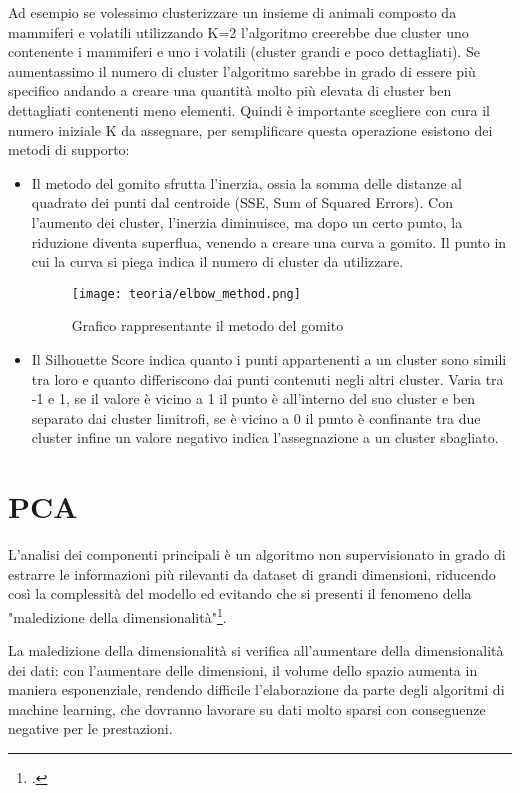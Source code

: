 Ad esempio se volessimo clusterizzare un insieme di animali composto da mammiferi e volatili utilizzando K=2 l'algoritmo creerebbe due cluster uno contenente i mammiferi e uno i volatili  (cluster grandi e poco dettagliati).
Se aumentassimo il numero di cluster l'algoritmo sarebbe in grado di essere più specifico andando a creare una quantità molto più elevata di cluster ben dettagliati contenenti meno elementi.
Quindi è importante scegliere con cura il numero iniziale K da assegnare, per semplificare questa operazione esistono dei metodi di supporto:
\begin{itemize}
    \item Il metodo del gomito sfrutta l’inerzia, ossia la somma delle distanze al quadrato dei punti dal centroide (SSE, Sum of Squared Errors). Con l'aumento dei cluster, l’inerzia diminuisce, ma dopo un certo punto, la riduzione diventa superflua, venendo a creare una curva a gomito. Il punto in cui la curva si piega indica il numero di cluster da utilizzare.
    
    \begin{figure}[!h] 
        \centering 
        \texttt{[image: teoria/elbow\_method.png]} 
        \caption{Grafico rappresentante il metodo del gomito}
        \label{fig:gomito}
      \end{figure}

    \item Il Silhouette Score indica quanto i punti appartenenti a un cluster sono simili tra loro e quanto differiscono dai punti contenuti negli altri cluster.
    Varia tra -1 e 1, se il valore è vicino a 1 il punto è all'interno del suo cluster e ben separato dai cluster limitrofi, se è vicino a 0 il punto è confinante tra due cluster infine un valore negativo indica l'assegnazione a un cluster sbagliato.
\end{itemize}

\section{PCA}
L'analisi dei componenti principali è un algoritmo non supervisionato in grado di estrarre le informazioni più rilevanti da dataset di grandi dimensioni, riducendo così la complessità del modello ed evitando che si presenti il fenomeno della "maledizione della dimensionalità"\footcite{site:PCA}.

La maledizione della dimensionalità si verifica all'aumentare della dimensionalità dei dati: con l'aumentare delle dimensioni, il volume dello spazio aumenta in maniera esponenziale, rendendo difficile l'elaborazione da parte degli algoritmi di machine learning, che dovranno lavorare su dati molto sparsi con conseguenze negative per le prestazioni.

